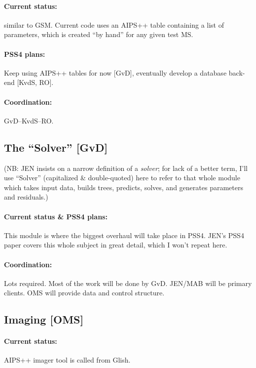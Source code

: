 \documentclass[12pt]{article}
\begin{document}
  \paragraph{Current status:} similar to GSM. Current code uses an AIPS++
  table containing a list of parameters, which is created ``by hand'' for
  any given test MS. 

  \paragraph{PSS4 plans:} Keep using AIPS++ tables for now [GvD],
  eventually develop a database back-end [KvdS, RO]. 
  
  \paragraph{Coordination:} GvD--KvdS--RO.

\subsection{The ``Solver'' [GvD]}

  (NB: JEN insists on a narrow definition of a {\em solver}; for lack of a
  better term, I'll use ``Solver'' (capitalized \& double-quoted) here to refer
  to that whole module which takes input data, builds trees, predicts, solves,
  and generates parameters and residuals.)

  \paragraph{Current status \& PSS4 plans:} This module is where the biggest
  overhaul will take place in PSS4. JEN's PSS4 paper \cite{PSS4} covers this
  whole subject in great detail, which I won't repeat here.

  \paragraph{Coordination:} Lots required. Most of the work will be done by
  GvD. JEN/MAB will be primary clients. OMS will provide data and control
  structure.

\subsection{Imaging [OMS]}

  \paragraph{Current status:} AIPS++ imager tool is called from Glish. 
\end{document}
